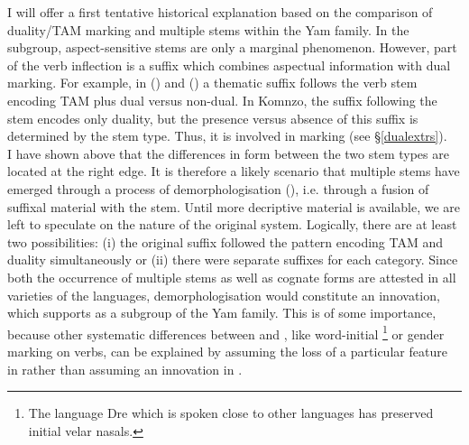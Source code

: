 I will offer a first tentative historical explanation based on the comparison of duality/TAM marking and multiple stems within the Yam family. In the  subgroup, aspect-sensitive stems are only a marginal phenomenon. However, part of the verb inflection is a suffix which combines aspectual information with dual marking. For example, in  (\citealt{Evans:2015to}) and  (\citealt{Siegel:2015bp}) a thematic suffix follows the verb stem encoding TAM plus dual versus non-dual. In Komnzo, the suffix following the stem encodes only duality, but the presence versus absence of this suffix is determined by the stem type. Thus, it is involved in marking  (see \S{}\ref{dualextrs}).\\

I have shown above that the differences in form between the two stem types are located at the right edge. It is therefore a likely scenario that multiple stems have emerged through a process of demorphologisation (\citealt[154]{Hopper:1990vm}), i.e. through a fusion of suffixal material with the stem. Until more decriptive material is available, we are left to speculate on the nature of the original system. Logically, there are at least two possibilities: (i) the original suffix followed the  pattern encoding TAM and duality simultaneously or (ii) there were separate suffixes for each category. Since both the occurrence of multiple stems as well as cognate forms are attested in all varieties of the  languages, demorphologisation would constitute an innovation, which supports  as a subgroup of the Yam family. This is of some importance, because other systematic differences between  and , like word-initial  \footnote{The  language Dre which is spoken close to other  languages has preserved initial velar nasals.} or gender marking on verbs, can be explained by assuming the loss of a particular feature in  rather than assuming an innovation in .\\

